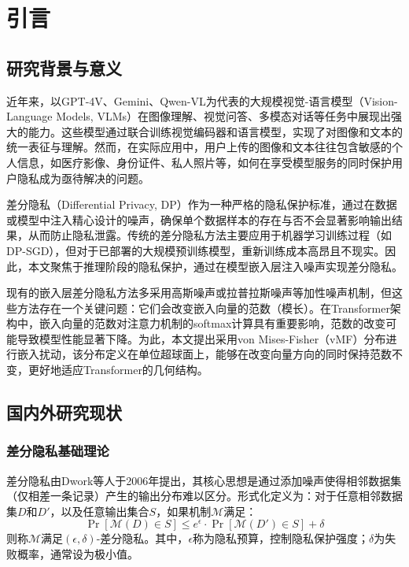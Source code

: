 \documentclass[a4paper,12pt]{article}
\begin{document}
\newpage
\tableofcontents

\newpage
{}

\section{引言}

\subsection{研究背景与意义}

近年来，以GPT-4V、Gemini、Qwen-VL为代表的大规模视觉-语言模型（Vision-Language Models, VLMs）在图像理解、视觉问答、多模态对话等任务中展现出强大的能力。这些模型通过联合训练视觉编码器和语言模型，实现了对图像和文本的统一表征与理解。然而，在实际应用中，用户上传的图像和文本往往包含敏感的个人信息，如医疗影像、身份证件、私人照片等，如何在享受模型服务的同时保护用户隐私成为亟待解决的问题。

差分隐私（Differential Privacy, DP）作为一种严格的隐私保护标准，通过在数据或模型中注入精心设计的噪声，确保单个数据样本的存在与否不会显著影响输出结果，从而防止隐私泄露。传统的差分隐私方法主要应用于机器学习训练过程（如DP-SGD），但对于已部署的大规模预训练模型，重新训练成本高昂且不现实。因此，本文聚焦于推理阶段的隐私保护，通过在模型嵌入层注入噪声实现差分隐私。

现有的嵌入层差分隐私方法多采用高斯噪声或拉普拉斯噪声等加性噪声机制，但这些方法存在一个关键问题：它们会改变嵌入向量的范数（模长）。在Transformer架构中，嵌入向量的范数对注意力机制的softmax计算具有重要影响，范数的改变可能导致模型性能显著下降。为此，本文提出采用von Mises-Fisher（vMF）分布进行嵌入扰动，该分布定义在单位超球面上，能够在改变向量方向的同时保持范数不变，更好地适应Transformer的几何结构。

\subsection{国内外研究现状}

\subsubsection{差分隐私基础理论}

差分隐私由Dwork等人于2006年提出，其核心思想是通过添加噪声使得相邻数据集（仅相差一条记录）产生的输出分布难以区分。形式化定义为：对于任意相邻数据集$D$和$D'$，以及任意输出集合$S$，如果机制$\mathcal{M}$满足：
\begin{equation}
\Pr[\mathcal{M}(D) \in S] \leq e^\epsilon \cdot \Pr[\mathcal{M}(D') \in S] + \delta
\end{equation}
则称$\mathcal{M}$满足$(\epsilon, \delta)$-差分隐私。其中，$\epsilon$称为隐私预算，控制隐私保护强度；$\delta$为失败概率，通常设为极小值。
\end{document}
